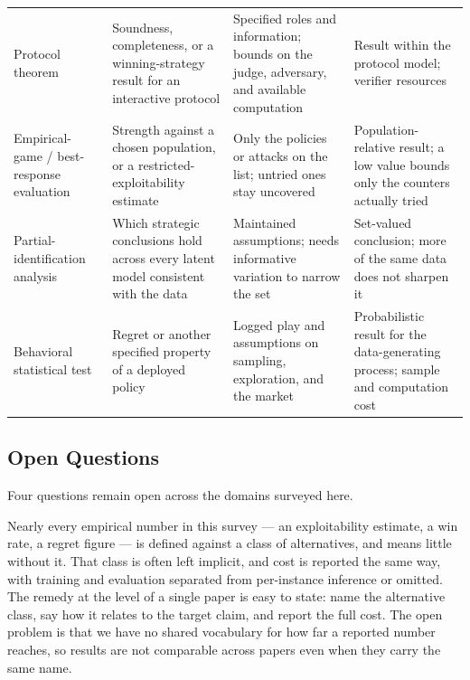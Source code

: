 \begin{table}[pos=h]
\begin{tabularx}{\textwidth}{
    >{\raggedright\arraybackslash}p{}
    >{\raggedright\arraybackslash}p{}
    Y
    Y
}
\addlinespace

Protocol theorem
& Soundness, completeness, or a winning-strategy result for an interactive
protocol
& Specified roles and information; bounds on the judge, adversary, and available
computation
& Result within the protocol model; verifier resources
\citep{Irving2018,BrownCohen2023}
\\

\addlinespace

Empirical-game / best-response evaluation
& Strength against a chosen population, or a restricted-exploitability estimate
& Only the policies or attacks on the list; untried ones stay uncovered
& Population-relative result; a low value bounds only the counters actually tried
\citep{Balduzzi2018,Lanctot2017}
\\

\addlinespace

Partial-identification analysis
& Which strategic conclusions hold across every latent model consistent with the
data
& Maintained assumptions; needs informative variation to narrow the set
& Set-valued conclusion; more of the same data does not sharpen it
\citep{HaileHortacsuKosenok2008}
\\

\addlinespace

Behavioral statistical test
& Regret or another specified property of a deployed policy
& Logged play and assumptions on sampling, exploration, and the market
& Probabilistic result for the data-generating process; sample and computation
cost \citep{HartlineLongZhang2024,HartlineWangZhang2025}
\\
\bottomrule
\end{tabularx}
\end{table}
\FloatBarrier

\subsection{Open Questions}
\label{sec:synthesis:open}

Four questions remain open across the domains surveyed here.

 Nearly every empirical number in this survey --- an
exploitability estimate, a win rate, a regret figure --- is defined against a
class of alternatives, and means little without it. That class is often left
implicit, and cost is reported the same way, with training and evaluation
separated from per-instance inference or omitted. The remedy at the level of a
single paper is easy to state: name the alternative class, say how it relates to
the target claim, and report the full cost. The open problem is that we have no
shared vocabulary for how far a reported number reaches, so results are not
comparable across papers even when they carry the same name.

